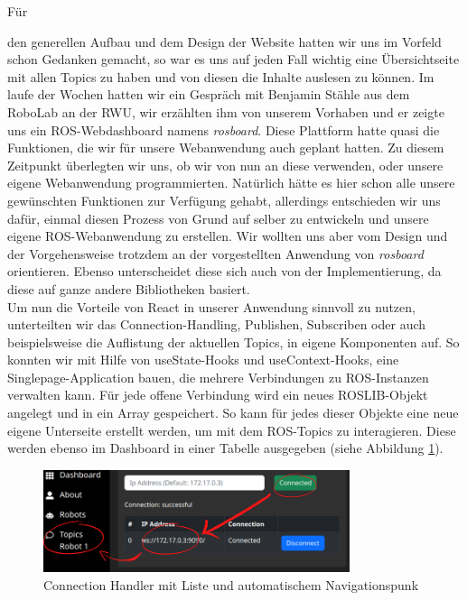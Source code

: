 \begin{flushleft}
\hypertarget{rosboard-target}{Für} den generellen Aufbau und dem Design der Website hatten wir uns im Vorfeld schon Gedanken gemacht, so war es uns auf jeden Fall wichtig eine Übersichtseite mit allen Topics zu haben und von diesen die Inhalte auslesen zu können.
Im laufe der Wochen hatten wir ein Gespräch mit Benjamin Stähle aus dem RoboLab an der RWU, wir erzählten ihm von unserem Vorhaben und er zeigte uns ein ROS-Webdashboard namens \textit{rosboard}.
Diese Plattform hatte quasi die Funktionen, die wir für unsere Webanwendung auch geplant hatten.
Zu diesem Zeitpunkt überlegten wir uns, ob wir von nun an diese verwenden, oder unsere eigene Webanwendung programmierten.
Natürlich hätte es hier schon alle unsere gewünschten Funktionen zur Verfügung gehabt, allerdings entschieden wir uns dafür, einmal diesen Prozess von Grund auf selber zu entwickeln und unsere eigene ROS-Webanwendung zu erstellen.
Wir wollten uns aber vom Design und der Vorgehensweise trotzdem an der vorgestellten Anwendung von \textit{rosboard} orientieren.
Ebenso unterscheidet diese sich auch von der Implementierung, da diese auf ganze andere Bibliotheken basiert.
\\

\vspace{0.5cm}
Um nun die Vorteile von React in unserer Anwendung sinnvoll zu nutzen, unterteilten wir das Connection-Handling, Publishen, Subscriben oder auch beispielsweise die Auflistung der aktuellen Topics, in eigene Komponenten auf.
So konnten wir mit Hilfe von useState-Hooks und useContext-Hooks, eine Singlepage-Application bauen, die mehrere Verbindungen zu ROS-Instanzen verwalten kann.
Für jede offene Verbindung wird ein neues ROSLIB-Objekt angelegt und in ein Array gespeichert.
So kann für jedes dieser Objekte eine neue eigene Unterseite erstellt werden, um mit dem ROS-Topics zu interagieren. Diese werden ebenso im Dashboard in einer Tabelle ausgegeben (siehe Abbildung \ref{fig:ros_conn}).

\begin{figure}[h!]
    \centering
    \includegraphics[width=0.8\textwidth]{imgs/web/ros_conn.png}
    \caption{Connection Handler mit Liste und automatischem Navigationspunk}
    \label{fig:ros_conn}%
\end{figure}
\end{flushleft}
    